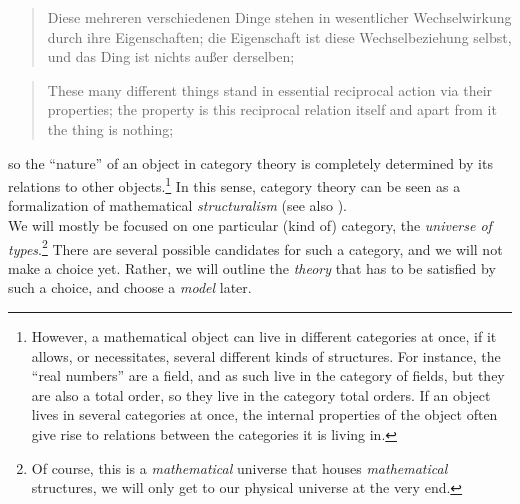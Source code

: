 \documentclass{article}
\begin{document}
\begin{quote}
    Diese mehreren verschiedenen Dinge stehen in wesentlicher Wechselwirkung durch ihre Eigenschaften;
die Eigenschaft ist diese Wechselbeziehung selbst, und das Ding ist nichts außer derselben;
\end{quote}

\begin{quote}
    These many different things stand in essential reciprocal action via their properties; the property
is this reciprocal relation itself and apart from it the thing is nothing;
\end{quote}

so the ``nature'' of an object in category theory is completely determined by its relations to other objects.\footnote{However,
a mathematical object can live in different categories at once, if it allows, or necessitates, several
different kinds of structures. For instance, the ``real numbers'' are a field, and as such live in the
category of fields, but they are also a total order, so they live in the category total orders. If an
object lives in several categories at once, the internal properties of the object often give rise to relations
between the categories it is living in.} In this sense, category theory can be seen as a formalization
of mathematical \emph{structuralism} (see also \cite{Ad03}). \\

We will mostly be focused on one particular (kind of) category, the \emph{universe of types}.\footnote{Of
course, this is a \emph{mathematical} universe that houses \emph{mathematical} structures, we will only
get to our physical universe at the very end.} There are several possible candidates for such a category,
and we will not make a choice yet. Rather, we will outline the \emph{theory} that has to be satisfied
by such a choice, and choose a \emph{model} later.
\end{document}
